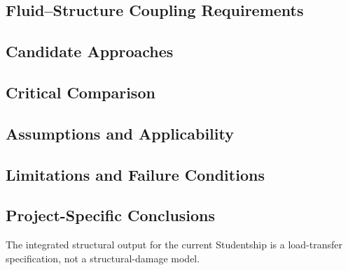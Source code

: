 
\subsection{Fluid--Structure Coupling Requirements}
\label{sec:res-str-spec-fluid-structure-coupling-requirements}


\subsection{Candidate Approaches}
\label{sec:res-str-spec-candidate-approaches}


\subsection{Critical Comparison}
\label{sec:res-str-spec-critical-comparison}


\subsection{Assumptions and Applicability}
\label{sec:res-str-spec-assumptions}


\subsection{Limitations and Failure Conditions}
\label{sec:res-str-spec-limitations}


\subsection{Project-Specific Conclusions}
\label{sec:res-str-spec-conclusions}

The integrated structural output for the current Studentship is a
load-transfer specification, not a structural-damage model.

